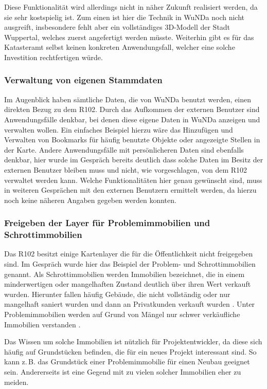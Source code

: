 Diese Funktionalität wird allerdings nicht in näher Zukunft realisiert werden, da sie sehr kostspielig ist.
Zum einen ist hier die Technik in \ac{WuNDa} noch nicht ausgreift, insbesondere fehlt aber ein vollständiges 3D-Modell der Stadt Wuppertal, welches zuerst angefertigt werden müsste.
Weiterhin gibt es für das Katasteramt selbst keinen konkreten Anwendungsfall, welcher eine solche Investition rechtfertigen würde.  

\subsubsection{Verwaltung von eigenen Stammdaten}
Im Augenblick haben sämtliche Daten, die von \ac{WuNDa} benutzt werden, einen direkten Bezug zu dem R102.
Durch das Aufkommen der externen Benutzer sind Anwendungsfälle denkbar, bei denen diese eigene Daten in \ac{WuNDa} anzeigen und verwalten wollen.
Ein einfaches Beispiel hierzu wäre das Hinzufügen und Verwalten von Bookmarks für häufig benutzte Objekte oder angezeigte Stellen in der Karte.
Andere Anwendungsfälle mit persönlicheren Daten sind ebenfalls denkbar, hier wurde im Gespräch bereits deutlich dass solche Daten im Besitz der externen Benutzer bleiben muss und nicht, wie vorgeschlagen, von dem R102 verwaltet werden kann.
Welche Funktionalitäten hier genau gewünscht sind, muss in weiteren Gesprächen mit den externen Benutzern ermittelt werden, da hierzu noch keine näheren Angaben gegeben werden konnten.
\subsubsection{Freigeben der Layer für Problemimmobilien und Schrottimmobilien}
Das R102 besitzt einige Kartenlayer die für die Öffentlichkeit nicht freigegeben sind.
Im Gespräch wurde hier das Beispiel der Problem- und Schrottimmobilien genannt.
Als Schrottimmobilien werden Immobilien bezeichnet, die in einem minderwertigen oder mangelhaften Zustand deutlich über ihren Wert verkauft wurden.
Hierunter fallen häufig Gebäude, die nicht vollständig oder nur mangelhaft saniert wurden und dann an Privatkunden verkauft wurden \autocite[vgl.][]{iva-schrottimmo}.
Unter Problemimmobilien werden auf Grund von Mängel nur schwer verkäufliche Immobilien verstanden \autocite[vgl.][]{immo-problemimmo}.

Das Wissen um solche Immobilien ist nützlich für Projektentwickler, da diese sich häufig auf Grundstücken befinden, die für ein neues Projekt interessant sind.
So kann z.\,B. das Grundstück einer Problemimmobilie für einen Neubau geeignet sein.
Andererseits ist eine Gegend mit zu vielen solcher Immobilien eher zu meiden.

